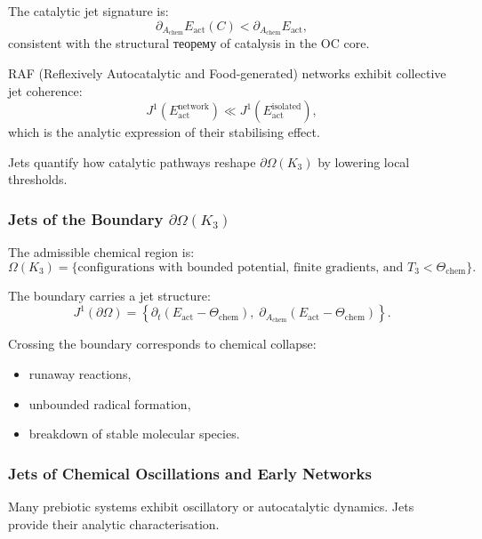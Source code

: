 The catalytic jet signature is:
\[
\partial_{A_{\mathrm{chem}}}E_{\mathrm{act}}(C)
<
\partial_{A_{\mathrm{chem}}}E_{\mathrm{act}},
\]
consistent with the structural теорему of catalysis in the OC core.

RAF (Reflexively Autocatalytic and Food-generated) networks exhibit
collective jet coherence:
\[
J^1(E_{\mathrm{act}}^{\mathrm{network}}) 
\ll 
J^1(E_{\mathrm{act}}^{\mathrm{isolated}}),
\]
which is the analytic expression of their stabilising effect.

Jets quantify how catalytic pathways reshape $\partial\Omega(K_3)$ by
lowering local thresholds.



\subsubsection{Jets of the Boundary \texorpdfstring{\texorpdfstring{$\partial\Omega(K_3)$}{\partial\Omega(K_3)}}{Boundary}}

The admissible chemical region is:
\[
\Omega(K_3)=
\{
\text{configurations with bounded potential, finite gradients, and }
T_3 < \Theta_{\mathrm{chem}}
\}.
\]

The boundary carries a jet structure:
\[
J^1(\partial\Omega)=
\left\{
\partial_t(E_{\mathrm{act}}-\Theta_{\mathrm{chem}}),\;
\partial_{A_{\mathrm{chem}}}(E_{\mathrm{act}}-\Theta_{\mathrm{chem}})
\right\}.
\]

Crossing the boundary corresponds to chemical collapse:

\begin{itemize}
    \item runaway reactions,
    \item unbounded radical formation,
    \item breakdown of stable molecular species.
\end{itemize}



\subsubsection{Jets of Chemical Oscillations and Early Networks}

Many prebiotic systems exhibit oscillatory or autocatalytic dynamics.
Jets provide their analytic characterisation.

